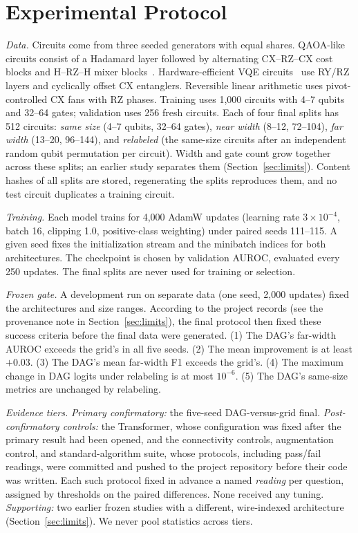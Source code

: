 \documentclass[conference,a4paper]{IEEEtran}
\begin{document}
\section{Experimental Protocol}

\emph{Data.} Circuits come from three seeded generators with equal shares. QAOA-like circuits consist of a Hadamard layer followed by alternating CX--RZ--CX cost blocks and H--RZ--H mixer blocks~\cite{farhi2014qaoa}. Hardware-efficient VQE circuits~\cite{peruzzo2014vqe} use RY/RZ layers and cyclically offset CX entanglers. Reversible linear arithmetic uses pivot-controlled CX fans with RZ phases. Training uses 1,000 circuits with 4--7 qubits and 32--64 gates; validation uses 256 fresh circuits. Each of four final splits has 512 circuits: \emph{same size} (4--7 qubits, 32--64 gates), \emph{near width} (8--12, 72--104), \emph{far width} (13--20, 96--144), and \emph{relabeled} (the same-size circuits after an independent random qubit permutation per circuit). Width and gate count grow together across these splits; an earlier study separates them (Section~\ref{sec:limits}). Content hashes of all splits are stored, regenerating the splits reproduces them, and no test circuit duplicates a training circuit.

\emph{Training.} Each model trains for 4,000 AdamW updates (learning rate $3\times10^{-4}$, batch 16, clipping 1.0, positive-class weighting) under paired seeds 111--115. A given seed fixes the initialization stream and the minibatch indices for both architectures. The checkpoint is chosen by validation AUROC, evaluated every 250 updates. The final splits are never used for training or selection.

\emph{Frozen gate.} A development run on separate data (one seed, 2,000 updates) fixed the architectures and size ranges. According to the project records (see the provenance note in Section~\ref{sec:limits}), the final protocol then fixed these success criteria before the final data were generated. (1) The DAG's far-width AUROC exceeds the grid's in all five seeds. (2) The mean improvement is at least $+0.03$. (3) The DAG's mean far-width F1 exceeds the grid's. (4) The maximum change in DAG logits under relabeling is at most $10^{-6}$. (5) The DAG's same-size metrics are unchanged by relabeling.

\emph{Evidence tiers.} \emph{Primary confirmatory:} the five-seed DAG-versus-grid final. \emph{Post-confirmatory controls:} the Transformer, whose configuration was fixed after the primary result had been opened, and the connectivity controls, augmentation control, and standard-algorithm suite, whose protocols, including pass/fail readings, were committed and pushed to the project repository before their code was written. Each such protocol fixed in advance a named \emph{reading} per question, assigned by thresholds on the paired differences. None received any tuning. \emph{Supporting:} two earlier frozen studies with a different, wire-indexed architecture (Section~\ref{sec:limits}). We never pool statistics across tiers.
\end{document}
